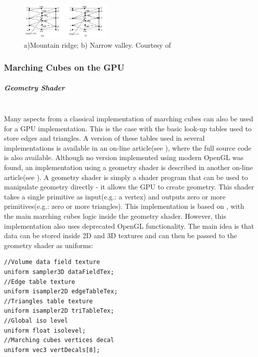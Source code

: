 \documentclass[]{article}
\begin{document}
\begin{appendices}
\begin{figure}[hbtp]
    \centering
    \includegraphics[width=0.4\textwidth]{figures/MountainRidgeNarrowValley.PNG}
    \caption{a)Mountain ridge; b) Narrow valley. Courtesy of \cite[Chapter~9]{berg08}}
    \label{fig:MountainRidgeNarrowValley}
\end{figure}

\subsubsection{Marching Cubes on the GPU}
\label{appendix:B-mc}

\subparagraph{Geometry Shader}\mbox{}\\

Many aspects from a classical implementation of marching cubes can also be used for a GPU implementation. This is the case with the basic look-up tables used to store edges and triangles. A version of these tables used in several implementations is available in an on-line article(see \cite{bourke1994}), where the full source code is also available. Although no version implemented using modern OpenGL was found, an implementation using a geometry shader is described in another on-line article(see \cite{crassin2007}). A geometry shader is simply a shader program that can be used to manipulate geometry directly - it allows the GPU to create geometry. This shader takes a single primitive as input(e.g.: a vertex) and outputs zero or more primitives(e.g.: zero or more triangles). 
This implementation is based on \cite{bourke1994}, with the main marching cubes logic inside the geometry shader. However, this implementation also uses deprecated OpenGL functionality. The main idea is that data can be stored inside 2D and 3D textures and can then be passed to the geometry shader as uniforms:

\begin{verbatim}
//Volume data field texture
uniform sampler3D dataFieldTex;
//Edge table texture
uniform isampler2D edgeTableTex;
//Triangles table texture
uniform isampler2D triTableTex;
//Global iso level
uniform float isolevel;
//Marching cubes vertices decal
uniform vec3 vertDecals[8];
\end{verbatim}


\end{appendices}
\end{document}
